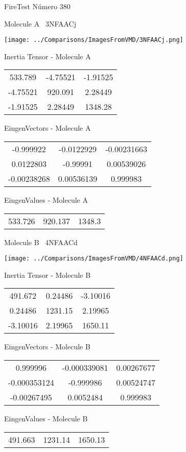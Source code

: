 \vtab[-3cm]
\begin{center}
{\large FireTest \tab Número 380}
\end{center}
\begin{multicols}{2}
\begin{center}

Molecule A \
3NFAACj

\texttt{[image: ../Comparisons/ImagesFromVMD/3NFAACj.png]}

Inertia Tensor - Molecule A \\
\begin{tabular}{|c c c|}
533.789	 & 	-4.75521	 & 	-1.91525	 \\
-4.75521	 & 	920.091	 & 	2.28449	 \\
-1.91525	 & 	2.28449	 & 	1348.28
\end{tabular}

\vtab
 EingenVectors - Molecule A     \\
\begin{tabular}{|c c c|}
-0.999922	 & 	-0.0122929	 & 	-0.00231663	 \\
0.0122803	 & 	-0.99991	 & 	0.00539026	 \\
-0.00238268	 & 	0.00536139	 & 	0.999983
\end{tabular}

\vtab
 EingenValues - Molecule A     \\
\begin{tabular}{|c c c|}
533.726	 & 	920.137	 & 	1348.3	 \\
\end{tabular}
\columnbreak

Molecule B \
4NFAACd

\texttt{[image: ../Comparisons/ImagesFromVMD/4NFAACd.png]}

Inertia Tensor - Molecule B \\
\begin{tabular}{|c c c|}
491.672	 & 	0.24486	 & 	-3.10016	 \\
0.24486	 & 	1231.15	 & 	2.19965	 \\
-3.10016	 & 	2.19965	 & 	1650.11
\end{tabular}

\vtab
 EingenVectors - Molecule B     \\
\begin{tabular}{|c c c|}
0.999996	 & 	-0.000339081	 & 	0.00267677	 \\
-0.000353124	 & 	-0.999986	 & 	0.00524747	 \\
-0.00267495	 & 	0.0052484	 & 	0.999983
\end{tabular}

\vtab
 EingenValues - Molecule B     \\
\begin{tabular}{|c c c|}
491.663	 & 	1231.14	 & 	1650.13	 \\
\end{tabular}

\end{center}
\end{multicols}

